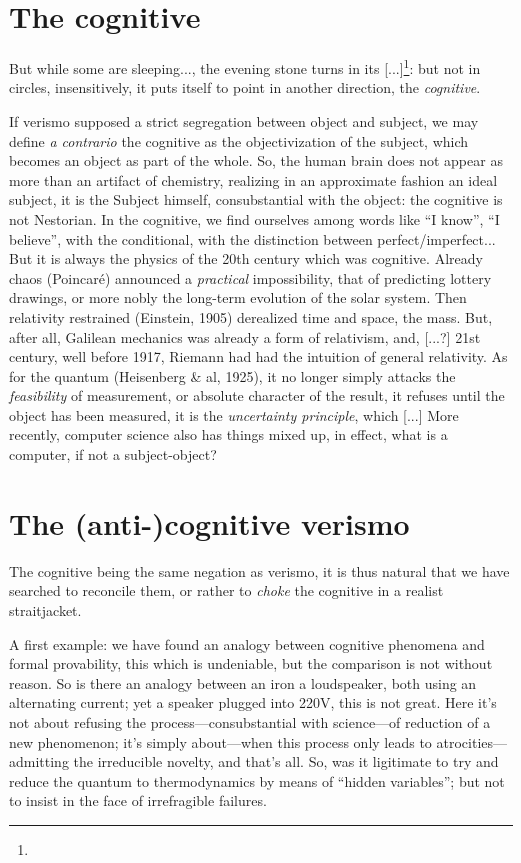 \documentclass{article}
\begin{document}
\section{The cognitive}
But while some are sleeping..., the evening stone turns in its [...]\footnote{}: but not in circles, insensitively, it puts itself to point in another direction, the \emph{cognitive}.

If verismo supposed a strict segregation between object and subject, we may define \emph{a contrario} the cognitive as the objectivization of the subject, which becomes an object as part of the whole. So, the human brain does not appear as more than an artifact of chemistry, realizing in an approximate fashion an ideal subject, it is the Subject himself, consubstantial with the object: the cognitive is not Nestorian. In the cognitive, we find ourselves among words like \enquote{I know}, \enquote{I believe}, with the conditional, with the distinction between perfect/imperfect... But it is always the physics of the 20th century which was cognitive. Already chaos (Poincaré) announced a \emph{practical} impossibility, that of predicting lottery drawings, or more nobly the long-term evolution of the solar system. Then relativity restrained (Einstein, 1905) derealized time and space, the mass. But, after all, Galilean mechanics was already a form of relativism, and, [...?] 21st century, well before 1917, Riemann had had the intuition of general relativity. As for the quantum (Heisenberg \& al, 1925), it no longer simply attacks the \emph{feasibility} of measurement, or absolute character of the result, it refuses until the object has been measured, it is the \emph{uncertainty principle}, which [...] More recently, computer science also has things mixed up, in effect, what is a computer, if not a subject-object?

\section{The (anti-)cognitive verismo}
The cognitive being the same negation as verismo, it is thus natural that we have searched to reconcile them, or rather to \emph{choke} the cognitive in a realist straitjacket.

A first example: we have found an analogy between cognitive phenomena and formal provability, this which is undeniable, but the comparison is not without reason. So is there an analogy between an iron a loudspeaker, both using an alternating current; yet a speaker plugged into 220V, this is not great. Here it's not about refusing the process---consubstantial with science---of reduction of a new phenomenon; it's simply about---when this process only leads to atrocities---admitting the irreducible novelty, and that's all. So, was it ligitimate to try and reduce the quantum to thermodynamics by means of \enquote{hidden variables}; but not to insist in the face of irrefragible failures.
\end{document}
